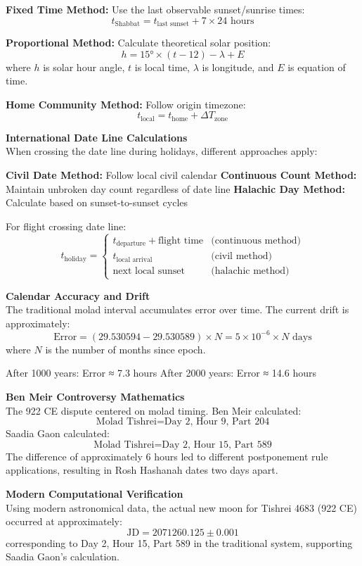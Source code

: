 \begin{technical}
\textbf{Fixed Time Method:} Use the last observable sunset/sunrise times:
$$
t_{\text{Shabbat}} = t_{\text{last sunset}} + 7 \times 24 \text{ hours}
$$

\textbf{Proportional Method:} Calculate theoretical solar position:
$$
h = 15° \times (t - 12) - \lambda + E
$$
where $h$ is solar hour angle, $t$ is local time, $\lambda$ is longitude, and $E$ is equation of time.

\textbf{Home Community Method:} Follow origin timezone:
$$
t_{\text{local}} = t_{\text{home}} + \Delta T_{\text{zone}}
$$

\textbf{International Date Line Calculations}\\[0.5em]
When crossing the date line during holidays, different approaches apply:

\textbf{Civil Date Method:} Follow local civil calendar
\textbf{Continuous Count Method:} Maintain unbroken day count regardless of date line
\textbf{Halachic Day Method:} Calculate based on sunset-to-sunset cycles

For flight crossing date line:
$$
t_{\text{holiday}} = \begin{cases}
t_{\text{departure}} + \text{flight time} & \text{(continuous method)} \\
t_{\text{local arrival}} & \text{(civil method)} \\
\text{next local sunset} & \text{(halachic method)}
\end{cases}
$$

\textbf{Calendar Accuracy and Drift}\\[0.5em]
The traditional molad interval accumulates error over time. The current drift is approximately:
$$
\text{Error} = (29.530594 - 29.530589) \times N = 5 \times 10^{-6} \times N \text{ days}
$$
where $N$ is the number of months since epoch.

After 1000 years: Error ≈ 7.3 hours
After 2000 years: Error ≈ 14.6 hours

\textbf{Ben Meir Controversy Mathematics}\\[0.5em]
The 922 CE dispute centered on molad timing. Ben Meir calculated:
$$
\text{Molad Tishrei} = \text{Day 2, Hour 9, Part 204}
$$
Saadia Gaon calculated:
$$
\text{Molad Tishrei} = \text{Day 2, Hour 15, Part 589}
$$
The difference of approximately 6 hours led to different postponement rule applications, resulting in Rosh Hashanah dates two days apart.

\textbf{Modern Computational Verification}\\[0.5em]
Using modern astronomical data, the actual new moon for Tishrei 4683 (922 CE) occurred at approximately:
$$
\text{JD} = 2071260.125 \pm 0.001
$$
corresponding to Day 2, Hour 15, Part 589 in the traditional system, supporting Saadia Gaon's calculation.


\end{technical}

